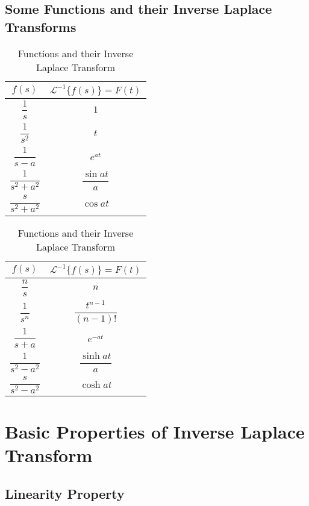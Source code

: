 \documentclass[12pt]{article}
\newcommand{\Lap}{\mathscr{L}}
\begin{document}
\subsection{Some Functions and their Inverse Laplace Transforms}

\begin{table}[htpb]

    \centering
    \begin{tabular}{c|c}
        \hline
        $f(s)$ & $\Lap^{-1} \{ f(s) \} = F(t)$ \\
        \hline\hline
        $\dfrac{1}{s}$ & $1$ \\
        \hline
        $\dfrac{1}{s^2}$ & $t$ \\
        \hline
        $\dfrac{1}{s-a}$ & $e^{at}$ \\
        \hline
        $\dfrac{1}{s^2+a^2}$ & $\dfrac{\sin{at}}{a}$ \\
        \hline
        $\dfrac{s}{s^2+a^2}$ & $\cos{at}$ \\
        \hline
    \end{tabular}
    \begin{tabular}{c | c}
        \hline
        $f(s)$ & $\Lap^{-1} \{ f(s) \} = F(t)$ \\
        \hline\hline
        $\dfrac{n}{s}$ & $n$ \\
        \hline
        $\dfrac{1}{s^n}$ & $\dfrac{t^{n-1}}{(n-1)!}$ \\
        \hline
        $\dfrac{1}{s+a}$ & $e^{-at}$ \\
        \hline
        $\dfrac{1}{s^2-a^2}$ & $\dfrac{\sinh{at}}{a}$ \\
        \hline
        $\dfrac{s}{s^2-a^2}$ & $\cosh{at}$ \\
        \hline
    \end{tabular}

    \caption{Functions and their Inverse Laplace Transform}
    \label{InvLapTable}
\end{table}


\section{Basic Properties of Inverse Laplace Transform}

\subsection{Linearity Property}
\end{document}
